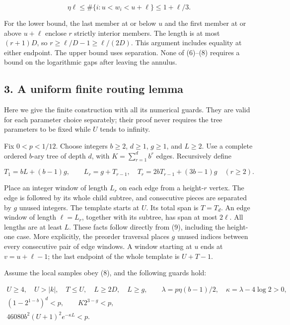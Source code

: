 \documentclass[
  11pt,
]{article}
\begin{document}
\[
 \eta\ell\le\#\{i:u<w_i<u+\ell\}\le1+\ell/3.            \tag{8}
\]

For the lower bound, the last member at or below \(u\) and the first
member at or above \(u+\ell\) enclose \(r\) strictly interior members.
The length is at most \((r+1)D\), so \(r\ge \ell /D-1\ge \ell /(2D)\).
This argument includes equality at either endpoint. The upper bound uses
separation. None of (6)--(8) requires a bound on the logarithmic gaps
after leaving the annulus.

\subsection{3. A uniform finite routing
lemma}\label{a-uniform-finite-routing-lemma}

Here we give the finite construction with all its numerical guards. They
are valid for each parameter choice separately; their proof never
requires the tree parameters to be fixed while \(U\) tends to infinity.

Fix \(0<p<1/12\). Choose integers \(b\ge 2\), \(d\ge 1\), \(g\ge 1\),
and \(L\ge 2\). Use a complete ordered \(b\)-ary tree of depth \(d\),
with \(K=\sum _{r=1}^d b^r\) edges. Recursively define

\[
 T_1=bL+(b-1)g,\qquad
 L_r=g+T_{r-1},\quad
 T_r=2bT_{r-1}+(3b-1)g\quad(r\ge2).                       \tag{9}
\]

Place an integer window of length \(L_r\) on each edge from a
height-\(r\) vertex. The edge is followed by its whole child subtree,
and consecutive pieces are separated by \(g\) unused integers. The
template starts at \(U\). Its total span is \(T=T_d\). An edge window of
length \(\ell =L_r\), together with its subtree, has span at most
\(2\ell\). All lengths are at least \(L\). These facts follow directly
from (9), including the height-one case. More explicitly, the preorder
traversal places \(g\) unused indices between every consecutive pair of
edge windows. A window starting at \(u\) ends at \(v=u+\ell -1\); the
last endpoint of the whole template is \(U+T-1\).

Assume the local samples obey (8), and the following guards hold:

\[
\begin{gathered}
 U\ge4,\quad U>|k|,\quad T\le U,\quad L\ge2D,\quad L\ge g,\qquad
 \lambda=p\eta(b-1)/2,\quad \kappa=\lambda-4\log2>0,\\
 (1-2^{1-b})^d<p,\qquad K2^{3-g}<p,\\
 46080b^2(U+1)^2e^{-\kappa L}<p.                           \tag{10}
\end{gathered}
\]
\end{document}
